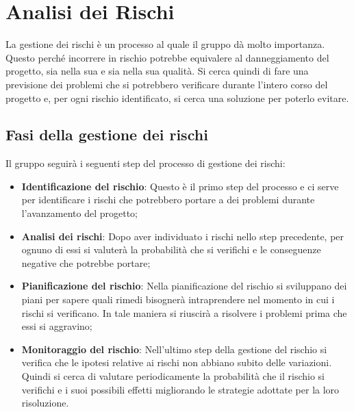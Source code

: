 \section{Analisi dei Rischi}
La gestione dei rischi è un processo al quale il gruppo \Gruppo{} dà molto importanza. Questo perché incorrere in rischio potrebbe equivalere al danneggiamento del progetto, sia nella sua  e sia nella sua qualità.
Si cerca quindi di fare una previsione dei problemi che si potrebbero verificare durante l'intero corso del progetto e, per ogni rischio identificato, si cerca una soluzione per poterlo evitare.

\subsection{Fasi della gestione dei rischi}
Il gruppo seguirà i seguenti step del processo di gestione dei rischi:
\begin{itemize}
	\item \textbf{Identificazione del rischio}: Questo è il primo step del processo e ci serve per identificare i rischi che potrebbero portare a dei problemi durante l'avanzamento del progetto; 
\end{itemize}
\begin{itemize}
	\item \textbf{Analisi dei rischi}: Dopo aver individuato i rischi nello step precedente, per ognuno di essi si valuterà la probabilità che si verifichi e le conseguenze negative che potrebbe portare;
\end{itemize}
\begin{itemize}
	\item \textbf{Pianificazione del rischio}: Nella pianificazione del rischio si sviluppano dei piani per sapere quali rimedi bisognerà intraprendere nel momento in cui i rischi si verificano. In tale maniera si riuscirà a risolvere i problemi prima che essi si aggravino;
\end{itemize}
\begin{itemize}
	\item \textbf{Monitoraggio del rischio}: Nell'ultimo step della gestione del rischio si verifica che le ipotesi relative ai rischi non abbiano subito delle variazioni. Quindi si cerca di valutare periodicamente la probabilità che il rischio si verifichi e i suoi possibili effetti migliorando le strategie adottate per la loro risoluzione.
\end{itemize}

